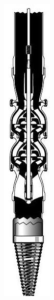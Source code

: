 \documentclass[10pt]{article}
\begin{document}
\includegraphics[max width=\textwidth]{2022_11_03_65aa625ded296bdfd01fg-23(1)}
\end{document}
